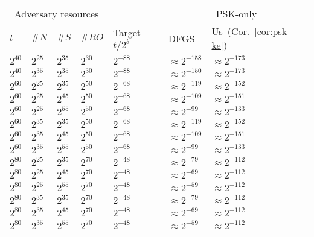 \begin{table}[t]
	\centering
	\footnotesize
	\renewcommand{\arraystretch}{0.01}
	\renewcommand{\tabcolsep}{0.15cm}
	\vspace{-0.3cm} %
	\begin{tabular}{@{}lllllll@{}}
		\toprule
		\multicolumn{4}{c}{Adversary resources}		&		& \multicolumn{2}{c}{PSK-only}	\\
		\cmidrule{1-4} \cmidrule{6-7}
		$t$	& $\#N$	& $\#S$ & $\#RO$ & Target $t/2^b$	& DFGS\,{\cite{JC:DFGS21}}~	& Us~{(Cor.~\ref{cor:psk-ke})} \\
		\midrule	
$2^{40}$	&$2^{25}$	&$2^{35}$	&$2^{30}$	&$2^{-88}$	&\cellcolor{green!25}$\approx 2^{-158}$	&\cellcolor{green!25}$\approx 2^{-173}$	\\
$2^{40}$	&$2^{35}$	&$2^{35}$	&$2^{30}$	&$2^{-88}$	&\cellcolor{green!25}$\approx 2^{-150}$	&\cellcolor{green!25}$\approx 2^{-173}$	\\
\midrule
$2^{60}$	&$2^{25}$	&$2^{35}$	&$2^{50}$	&$2^{-68}$	&\cellcolor{green!25}$\approx 2^{-119}$	&\cellcolor{green!25}$\approx 2^{-152}$	\\
$2^{60}$	&$2^{25}$	&$2^{45}$	&$2^{50}$	&$2^{-68}$	&\cellcolor{green!25}$\approx 2^{-109}$	&\cellcolor{green!25}$\approx 2^{-151}$	\\
$2^{60}$	&$2^{25}$	&$2^{55}$	&$2^{50}$	&$2^{-68}$	&\cellcolor{green!25}$\approx 2^{-99}$	&\cellcolor{green!25}$\approx 2^{-133}$	\\
$2^{60}$	&$2^{35}$	&$2^{35}$	&$2^{50}$	&$2^{-68}$	&\cellcolor{green!25}$\approx 2^{-119}$	&\cellcolor{green!25}$\approx 2^{-152}$	\\
$2^{60}$	&$2^{35}$	&$2^{45}$	&$2^{50}$	&$2^{-68}$	&\cellcolor{green!25}$\approx 2^{-109}$	&\cellcolor{green!25}$\approx 2^{-151}$	\\
$2^{60}$	&$2^{35}$	&$2^{55}$	&$2^{50}$	&$2^{-68}$	&\cellcolor{green!25}$\approx 2^{-99}$	&\cellcolor{green!25}$\approx 2^{-133}$	\\
\midrule
$2^{80}$	&$2^{25}$	&$2^{35}$	&$2^{70}$	&$2^{-48}$	&\cellcolor{green!25}$\approx 2^{-79}$	&\cellcolor{green!25}$\approx 2^{-112}$	\\
$2^{80}$	&$2^{25}$	&$2^{45}$	&$2^{70}$	&$2^{-48}$	&\cellcolor{green!25}$\approx 2^{-69}$	&\cellcolor{green!25}$\approx 2^{-112}$	\\
$2^{80}$	&$2^{25}$	&$2^{55}$	&$2^{70}$	&$2^{-48}$	&\cellcolor{green!25}$\approx 2^{-59}$	&\cellcolor{green!25}$\approx 2^{-112}$	\\
$2^{80}$	&$2^{35}$	&$2^{35}$	&$2^{70}$	&$2^{-48}$	&\cellcolor{green!25}$\approx 2^{-79}$	&\cellcolor{green!25}$\approx 2^{-112}$	\\
$2^{80}$	&$2^{35}$	&$2^{45}$	&$2^{70}$	&$2^{-48}$	&\cellcolor{green!25}$\approx 2^{-69}$	&\cellcolor{green!25}$\approx 2^{-112}$	\\
$2^{80}$	&$2^{35}$	&$2^{55}$	&$2^{70}$	&$2^{-48}$	&\cellcolor{green!25}$\approx 2^{-59}$	&\cellcolor{green!25}$\approx 2^{-112}$	\\
	\bottomrule
	\end{tabular}
	

\end{table}
